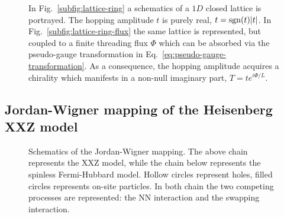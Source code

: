 \begin{figure}[t]
	\centering
	\hfil
	\caption{In Fig.~\ref{subfig:lattice-ring} a schematics of a $1D$ closed lattice is portrayed. The hopping amplitude $t$ is purely real, $t = \mathrm{sgn}(t) \abs{t}$. In Fig.~\ref{subfig:lattice-ring-flux} the same lattice is represented, but coupled to a finite threading flux $\Phi$ which can be absorbed via the pseudo-gauge transformation in Eq.~\eqref{eq:pseudo-gauge-transformation}. As a consequence, the hopping amplitude acquires a chirality which manifests in a non-null imaginary part, $T = t e^{i\Phi/L}$.}
	\label{fig:lattice-rings}
\end{figure}

\subsection{Jordan-Wigner mapping of the Heisenberg XXZ model}

\begin{figure}
	\centering
	
	\caption{Schematics of the Jordan-Wigner mapping. The above chain represents the $\mathrm{XXZ}$ model, while the chain below represents the spinless Fermi-Hubbard model. Hollow circles represent holes, filled circles represents on-site particles. In both chain the two competing processes are represented: the NN interaction and the swapping interaction.}
	\label{fig:jordan-wigner-mapping}
\end{figure}

